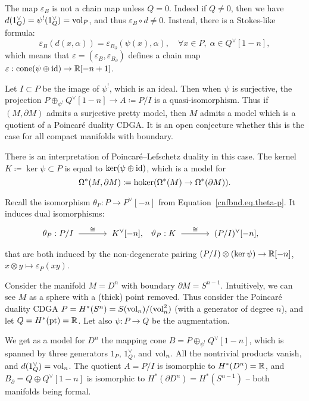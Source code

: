 \begin{remark}
  \label{cnfbnd.rmk.epsilon-chain-map}
  The map $\varepsilon_{B}$ is not a chain map unless $Q = 0$.
  Indeed if $Q \neq 0$, then we have $d(1_{Q}^{\vee}) = \psi^{!}(1_{Q}^{\vee}) = \mathrm{vol}_{P}$, and thus $\varepsilon_{B} \circ d \neq 0$.
  Instead, there is a Stokes-like formula:
  \begin{equation}
    \varepsilon_{B}(d(x,\alpha)) = \varepsilon_{B_{\partial}}(\psi(x), \alpha), \quad \forall x \in P, \; \alpha \in Q^{\vee}[1-n],
  \end{equation}
  which means that $\varepsilon = (\varepsilon_{B}, \varepsilon_{B_{\partial}})$ defines a chain map $\varepsilon : \operatorname{cone}(\psi \oplus \operatorname{id}) \to \mathbb{R}[-n+1]$.
\end{remark}

Let $I \subset P$ be the image of $\psi^{!}$, which is an ideal.
Then when $\psi$ is surjective, the projection $P \oplus_{\psi^{!}} Q^{\vee}[1-n] \to A \coloneqq P/I$ is a quasi-isomorphism.
Thus if $(M, \partial M)$ admits a surjective pretty model, then $M$ admits a model which is a quotient of a Poincaré duality CDGA.\@
It is an open conjecture whether this is the case for all compact manifolds with boundary.

There is an interpretation of Poincaré--Lefschetz duality in this case.
The kernel $K \coloneqq \ker \psi \subset P$ is equal to $\ker(\psi \oplus \operatorname{id})$, which is a model for
\[ \Omega^{*}(M, \partial M) \coloneqq \operatorname{hoker}(\Omega^{*}(M) \to \Omega^{*}(\partial M)). \]

Recall the isomorphism $\theta_{P} : P \to P^{\vee}[-n]$ from Equation~\eqref{cnfbnd.eq.theta-p}.
It induces dual isomorphisms:
\begin{align}
  \label{cnfbnd.eq.lefschetz}
  \theta_{P} : P/I
  & \tkrightarrow{\cong} K^{\vee}[-n],
  & \vartheta_{P} : K
  & \tkrightarrow{\cong} (P/I)^{\vee}[-n],
\end{align}
that are both induced by the non-degenerate pairing $(P/I) \otimes (\ker \psi) \to \mathbb{R}[-n]$, $x \otimes y \mapsto \varepsilon_{P}(xy)$.

\begin{example}
  \label{cnfbnd.exa.model-dn}
  Consider the manifold $M = D^{n}$ with boundary $\partial M = S^{n-1}$.
  Intuitively, we can see $M$ as a sphere with a (thick) point removed.
  Thus consider the Poincaré duality CDGA $P = H^{*}(S^{n}) = S(\mathrm{vol}_{n}) / (\mathrm{vol}_{n}^{2})$ (with a generator of degree $n$), and let $Q = H^{*}(\mathrm{pt}) = \mathbb{R}$.
  Let also $\psi : P \to Q$ be the augmentation.

  We get as a model for $D^{n}$ the mapping cone $B = P \oplus_{\psi^{!}} Q^{\vee}[1-n]$, which is spanned by three generators $1_{P}$, $1_{Q}^{\vee}$, and $\mathrm{vol}_{n}$.
  All the nontrivial products vanish, and $d(1_{Q}^{\vee}) = \mathrm{vol}_{n}$.
  The quotient $A = P/I$ is isomorphic to $H^{*}(D^{n}) = \mathbb{R}$, and $B_{\partial} = Q \oplus Q^{\vee}[1-n]$ is isomorphic to $H^{*}(\partial D^{n}) = H^{*}(S^{n-1})$ -- both manifolds being formal.
\end{example}

